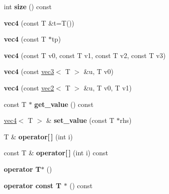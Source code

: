 \begin{DoxyCompactItemize}
\item 
\hypertarget{classnv_1_1vec4_a8937bf15df78e84c5a9983924823d02d}{}\label{classnv_1_1vec4_a8937bf15df78e84c5a9983924823d02d} 
int {\bfseries size} () const
\item 
\hypertarget{classnv_1_1vec4_a0470436181d9e8f169f71bba61e5f4ee}{}\label{classnv_1_1vec4_a0470436181d9e8f169f71bba61e5f4ee} 
{\bfseries vec4} (const T \&t=T())
\item 
\hypertarget{classnv_1_1vec4_a49189b4f132699a853a585e7abd3d4a4}{}\label{classnv_1_1vec4_a49189b4f132699a853a585e7abd3d4a4} 
{\bfseries vec4} (const T $\ast$tp)
\item 
\hypertarget{classnv_1_1vec4_a2ba35eefe81119c372be34475d33a49c}{}\label{classnv_1_1vec4_a2ba35eefe81119c372be34475d33a49c} 
{\bfseries vec4} (const T v0, const T v1, const T v2, const T v3)
\item 
\hypertarget{classnv_1_1vec4_aaa0de52ffe83b44710ded7a797f978f6}{}\label{classnv_1_1vec4_aaa0de52ffe83b44710ded7a797f978f6} 
{\bfseries vec4} (const \hyperlink{classnv_1_1vec3}{vec3}$<$ T $>$ \&u, T v0)
\item 
\hypertarget{classnv_1_1vec4_ab62d37042a2dcf73249ac20464b64d84}{}\label{classnv_1_1vec4_ab62d37042a2dcf73249ac20464b64d84} 
{\bfseries vec4} (const \hyperlink{classnv_1_1vec2}{vec2}$<$ T $>$ \&u, T v0, T v1)
\item 
\hypertarget{classnv_1_1vec4_a1c7530b525dc0b5b52c35bbfb0cf5a1e}{}\label{classnv_1_1vec4_a1c7530b525dc0b5b52c35bbfb0cf5a1e} 
const T $\ast$ {\bfseries get\+\_\+value} () const
\item 
\hypertarget{classnv_1_1vec4_a3ff55b6469beb2b7ac4abb389cc91921}{}\label{classnv_1_1vec4_a3ff55b6469beb2b7ac4abb389cc91921} 
\hyperlink{classnv_1_1vec4}{vec4}$<$ T $>$ \& {\bfseries set\+\_\+value} (const T $\ast$rhs)
\item 
\hypertarget{classnv_1_1vec4_adab48546512b2c5a4f359061441fa661}{}\label{classnv_1_1vec4_adab48546512b2c5a4f359061441fa661} 
T \& {\bfseries operator\mbox{[}$\,$\mbox{]}} (int i)
\item 
\hypertarget{classnv_1_1vec4_a8094ae9a3c2932b991a1aee968bd8ecf}{}\label{classnv_1_1vec4_a8094ae9a3c2932b991a1aee968bd8ecf} 
const T \& {\bfseries operator\mbox{[}$\,$\mbox{]}} (int i) const
\item 
\hypertarget{classnv_1_1vec4_ad8942f10311bdcfae11cef5dbfcf487a}{}\label{classnv_1_1vec4_ad8942f10311bdcfae11cef5dbfcf487a} 
{\bfseries operator T$\ast$} ()
\item 
\hypertarget{classnv_1_1vec4_ae464a39da81243597effea0da547c776}{}\label{classnv_1_1vec4_ae464a39da81243597effea0da547c776} 
{\bfseries operator const T $\ast$} () const
\end{DoxyCompactItemize}
